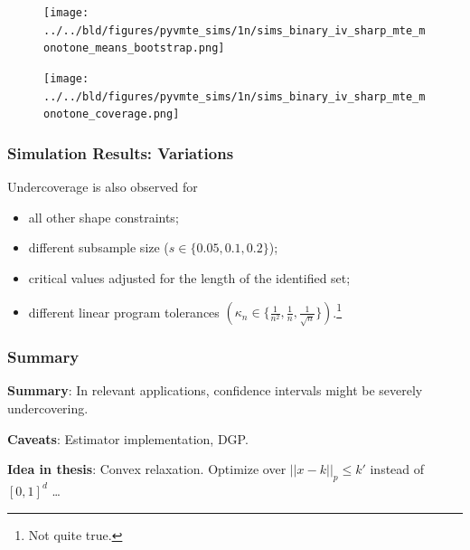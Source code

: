 \documentclass[11pt, aspectratio=169]{beamer}
\begin{document}
\begin{frame}

    \begin{figure}
        \texttt{[image: ../../bld/figures/pyvmte\_sims/1n/sims\_binary\_iv\_sharp\_mte\_monotone\_means\_bootstrap.png]}
    \end{figure}

\end{frame}

\begin{frame}

    \begin{figure}
        \texttt{[image: ../../bld/figures/pyvmte\_sims/1n/sims\_binary\_iv\_sharp\_mte\_monotone\_coverage.png]}
    \end{figure}

\end{frame}

\begin{frame}
    \frametitle{Simulation Results: Variations}
    Undercoverage is also observed for
    \begin{itemize}
        \item all other shape constraints;
        \item different subsample size ($s\in\{0.05, 0.1, 0.2\}$);
        \item critical values adjusted for the length of the identified set;
        \item different linear program tolerances $(\kappa_n \in \{\frac{1}{n^2}, \frac{1}{n}, \frac{1}{\sqrt{n}}\})$.\footnote{
            Not quite true.
        }
    \end{itemize}

\end{frame}

\begin{frame}
    \frametitle{Summary}

    \textbf{Summary}: In relevant applications, confidence intervals might be severely undercovering.

    \vspace{0.5cm}

    \textbf{Caveats}: Estimator implementation, DGP\@.

    \vspace{0.5cm}

    \pause

    \textbf{Idea in thesis}: Convex relaxation. Optimize over $||x-k||_p\leq k'$ instead of $[0,1]^d$ \dots

    \vspace{0.5cm}

    \footnotesize  \hyperlink{convex_relax}{}

\end{frame}
\end{document}
